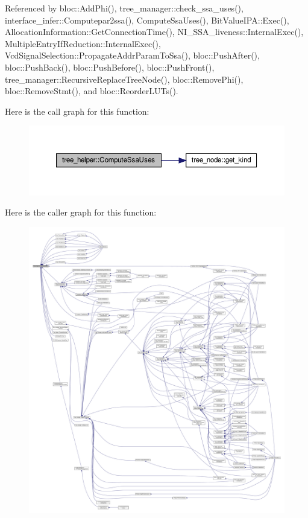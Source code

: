 Referenced by bloc\+::\+Add\+Phi(), tree\+\_\+manager\+::check\+\_\+ssa\+\_\+uses(), interface\+\_\+infer\+::\+Computepar2ssa(), Compute\+Ssa\+Uses(), Bit\+Value\+I\+P\+A\+::\+Exec(), Allocation\+Information\+::\+Get\+Connection\+Time(), N\+I\+\_\+\+S\+S\+A\+\_\+liveness\+::\+Internal\+Exec(), Multiple\+Entry\+If\+Reduction\+::\+Internal\+Exec(), Vcd\+Signal\+Selection\+::\+Propagate\+Addr\+Param\+To\+Ssa(), bloc\+::\+Push\+After(), bloc\+::\+Push\+Back(), bloc\+::\+Push\+Before(), bloc\+::\+Push\+Front(), tree\+\_\+manager\+::\+Recursive\+Replace\+Tree\+Node(), bloc\+::\+Remove\+Phi(), bloc\+::\+Remove\+Stmt(), and bloc\+::\+Reorder\+L\+U\+Ts().

Here is the call graph for this function\+:
\nopagebreak
\begin{figure}[H]
\begin{center}
\leavevmode
\includegraphics[width=350pt]{d7/d99/classtree__helper_a89952195432e48a6beba86df47fa88c7_cgraph}
\end{center}
\end{figure}
Here is the caller graph for this function\+:
\nopagebreak
\begin{figure}[H]
\begin{center}
\leavevmode
\includegraphics[width=350pt]{d7/d99/classtree__helper_a89952195432e48a6beba86df47fa88c7_icgraph}
\end{center}
\end{figure}
\mbox{\label{classtree__helper_a8c3efd03b279f356eb1c2beacb6b4eaf}} 
